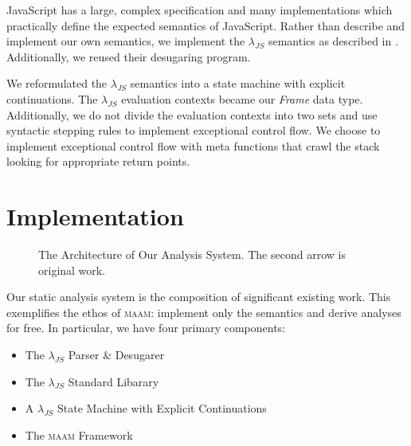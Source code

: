 \documentclass[10pt,letter,english]{article}
\newcommand{\maam}[0]{\textsc{maam}}
\newcommand{\js}[0]{JavaScript}
\newcommand{\lambdajs}[0]{$\lambda_{JS}$}
\begin{document}
\js{} has a large, complex specification and many implementations which
practically define the expected semantics of \js{}. Rather than describe and
implement our own semantics, we implement the \lambdajs{} semantics as described
in \cite{lambdajs}. Additionally, we reused their desugaring program.

We reformulated the \lambdajs{} semantics into a state machine with explicit
continuations. The \lambdajs{} evaluation contexts became our \emph{Frame} data
type. Additionally, we do not divide the evaluation contexts into two sets and
use syntactic stepping rules to implement exceptional control flow. We choose to
implement exceptional control flow with meta functions that crawl the stack
looking for appropriate return points.

\section{Implementation}

\begin{figure}
\centering

\caption{The Architecture of Our Analysis System. The second arrow is original work.}
\end{figure}

Our static analysis system is the composition of significant existing work. This
exemplifies the ethos of \maam{}: implement only the semantics and derive
analyses for free. In particular, we have four primary components:

\begin{itemize}
\item The \lambdajs{} Parser \& Desugarer
\item The \lambdajs{} Standard Libarary
\item A \lambdajs{} State Machine with Explicit Continuations
\item The \maam{} Framework
\end{itemize}
\end{document}
